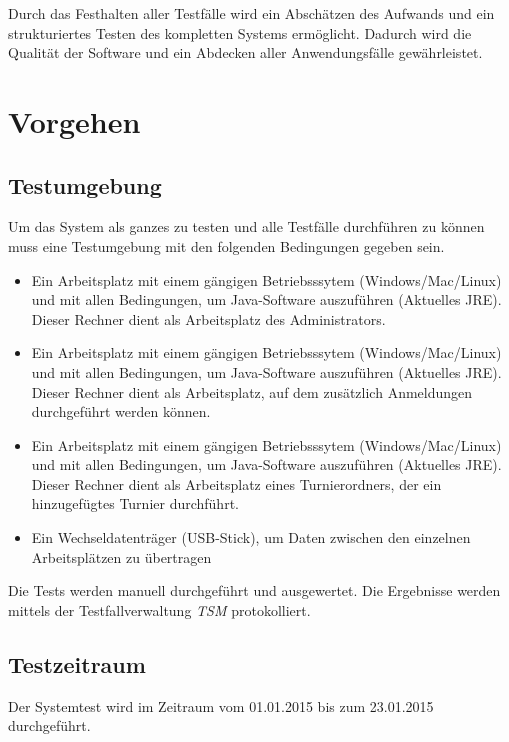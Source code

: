 \documentclass[11pt]{article}
\begin{document}
Durch das Festhalten aller Testfälle wird ein Abschätzen des Aufwands und ein strukturiertes Testen des kompletten Systems ermöglicht. Dadurch wird die Qualität der Software und ein Abdecken aller Anwendungsfälle gewährleistet.

\newpage

\section{Vorgehen}

\subsection{Testumgebung}

Um das System als ganzes zu testen und alle Testfälle durchführen zu können muss eine Testumgebung mit den folgenden Bedingungen gegeben sein.

\begin{itemize}
	\item Ein Arbeitsplatz mit einem gängigen Betriebsssytem (Windows/Mac/Linux) und mit allen Bedingungen, um Java-Software auszuführen (Aktuelles JRE). Dieser Rechner dient als Arbeitsplatz des Administrators.
	\item Ein Arbeitsplatz mit einem gängigen Betriebsssytem (Windows/Mac/Linux) und mit allen Bedingungen, um Java-Software auszuführen (Aktuelles JRE). Dieser Rechner dient als Arbeitsplatz, auf dem zusätzlich Anmeldungen durchgeführt werden können.
	\item Ein Arbeitsplatz mit einem gängigen Betriebsssytem (Windows/Mac/Linux) und mit allen Bedingungen, um Java-Software auszuführen (Aktuelles JRE). Dieser Rechner dient als Arbeitsplatz eines Turnierordners, der ein hinzugefügtes Turnier durchführt.
	\item Ein Wechseldatenträger (USB-Stick), um Daten zwischen den einzelnen Arbeitsplätzen zu übertragen
\end{itemize}

Die Tests werden manuell durchgeführt und ausgewertet. Die Ergebnisse werden mittels der Testfallverwaltung \textit{TSM} protokolliert.

\subsection{Testzeitraum}

Der Systemtest wird im Zeitraum vom 01.01.2015 bis zum 23.01.2015 durchgeführt.
\end{document}
